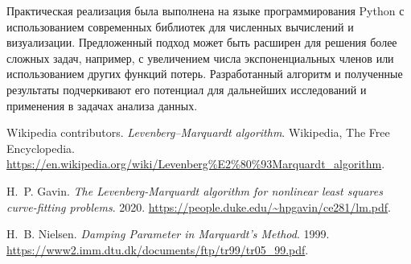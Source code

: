 Практическая реализация была выполнена на языке программирования Python с использованием современных библиотек для численных вычислений и визуализации. Предложенный подход может быть расширен для решения более сложных задач, например, с увеличением числа экспоненциальных членов или использованием других функций потерь. Разработанный алгоритм и полученные результаты подчеркивают его потенциал для дальнейших исследований и применения в задачах анализа данных.

\newpage

\begin{thebibliography}{99}
	Wikipedia contributors.
	\emph{Levenberg--Marquardt algorithm}.
	Wikipedia, The Free Encyclopedia. 
	\url{https://en.wikipedia.org/wiki/Levenberg%E2%80%93Marquardt_algorithm}.

	H.~P. Gavin.
	\emph{The Levenberg-Marquardt algorithm for nonlinear least squares curve-fitting problems}.
	2020. 
	\url{https://people.duke.edu/~hpgavin/ce281/lm.pdf}.

	H.~B. Nielsen.
	\emph{Damping Parameter in Marquardt's Method}.
	1999.
	\url{https://www2.imm.dtu.dk/documents/ftp/tr99/tr05_99.pdf}.
\end{thebibliography}

